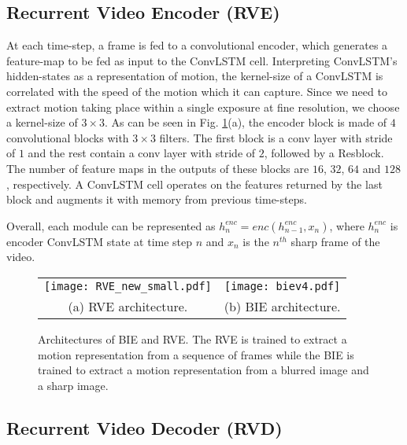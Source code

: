 \documentclass[10pt,twocolumn,letterpaper]{article}
\begin{document}
\subsection{Recurrent Video Encoder (RVE)}
\label{sec:rve}

At each time-step, a frame is fed to a convolutional encoder, which generates a feature-map to be fed as input to the ConvLSTM cell. Interpreting ConvLSTM's hidden-states as a representation of motion, the kernel-size of a ConvLSTM is correlated with the speed of the motion which it can capture. Since we need to extract motion taking place within a single exposure at fine resolution, we choose a kernel-size of $3\times3$. As can be seen in Fig. \ref{fig:BIEnRVE}(a), the encoder block is made of $4$ convolutional blocks with $3\times3$ filters. The first block is a conv layer with stride of $1$ and the rest contain a conv layer with stride of $2$, followed by a Resblock. The number of feature maps in the outputs of these blocks are $16$, $32$, $64$ and $128$, respectively. A ConvLSTM cell operates on the features returned by the last block and augments it with memory from previous time-steps.

Overall, each module can be represented as $h^{enc}_n = enc(h^{enc}_{n-1},x_{n})$,
where $h^{enc}_{n}$ is encoder ConvLSTM state at time step $n$ and $x_{n}$ is the $n^{th}$ sharp frame of the video.

\begin{figure}
\begin{center}
 \begin{tabular}{cc}
   \texttt{[image: RVE\_new\_small.pdf]} &
      \texttt{[image: biev4.pdf]}\\

            (a) RVE architecture. & (b)  BIE architecture.
       \end{tabular}
\end{center}
   \caption{Architectures of BIE and RVE. The RVE is trained to extract a motion representation from a sequence of frames while the BIE is trained to extract a motion representation from a blurred image and a sharp image.}
\label{fig:BIEnRVE}
\end{figure}


\subsection{Recurrent Video Decoder (RVD)}
\label{sec:rvd}
\end{document}
